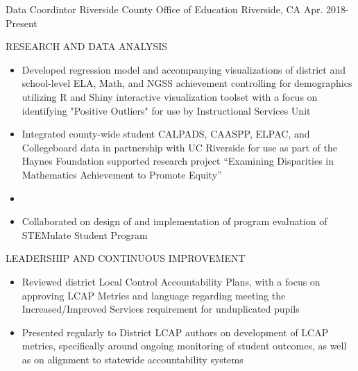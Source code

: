 

\begin{cventries}

  \cventry
    {Data Coordintor} %
    {Riverside County Office of Education} %
    {Riverside, CA} %
    {Apr. 2018-Present} %
    {
      \begin{cvitems} %
          \item RESEARCH AND DATA ANALYSIS
          \begin{itemize}
            \item {Developed regression model and accompanying visualizations of
            district and school-level ELA, Math, and NGSS achievement controlling for
            demographics utilizing R and Shiny interactive visualization toolset with
            a focus on identifying "Positive Outliers" for use by Instructional
            Services Unit}
            \item {Integrated county-wide student CALPADS, CAASPP, ELPAC, and
            Collegeboard data in partnership with UC Riverside for use as part of the
            Haynes Foundation supported research project “Examining Disparities in
            Mathematics Achievement to Promote Equity”}
            \item {}
            \item {Collaborated on design of and implementation of program evaluation of 
            STEMulate Student Program}
          \end{itemize}
          \item LEADERSHIP AND CONTINUOUS IMPROVEMENT
          \begin{itemize}
            \item {Reviewed district Local Control Accountability Plans, with a focus
            on approving LCAP Metrics and language regarding meeting the
            Increased/Improved Services requirement for unduplicated pupils}
            \item {Presented regularly to District LCAP authors on development of
            LCAP metrics, specifically around ongoing monitoring of student outcomes,
            as well as on alignment to statewide accountability systems}
          \end{itemize}
      \end{cvitems}
    }


\end{cventries}
